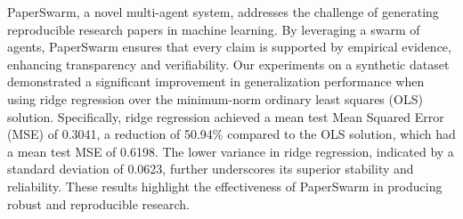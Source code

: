 PaperSwarm, a novel multi-agent system, addresses the challenge of generating reproducible research papers in machine learning. By leveraging a swarm of agents, PaperSwarm ensures that every claim is supported by empirical evidence, enhancing transparency and verifiability. Our experiments on a synthetic dataset demonstrated a significant improvement in generalization performance when using ridge regression over the minimum-norm ordinary least squares (OLS) solution. Specifically, ridge regression achieved a mean test Mean Squared Error (MSE) of 0.3041, a reduction of 50.94\% compared to the OLS solution, which had a mean test MSE of 0.6198. The lower variance in ridge regression, indicated by a standard deviation of 0.0623, further underscores its superior stability and reliability. These results highlight the effectiveness of PaperSwarm in producing robust and reproducible research.
